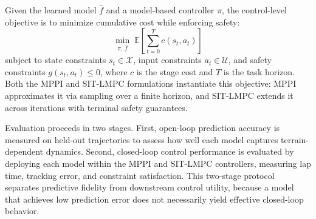Given the learned model $\hat{f}$ and a model-based controller $\pi$, the control-level objective is to minimize cumulative cost while enforcing safety:
\begin{equation}
  \min_{\pi,\, \hat{f}} \;\mathbb{E}\!\left[\sum_{t=0}^{T} c(s_t, a_t)\right]
  \label{eq:eval-objective}
\end{equation}
subject to state constraints $s_t \in \mathcal{X}$, input constraints $a_t \in \mathcal{U}$, and safety constraints $g(s_t, a_t) \le 0$, where $c$ is the stage cost and $T$ is the task horizon. Both the MPPI and SIT-LMPC formulations instantiate this objective: MPPI approximates it via sampling over a finite horizon, and SIT-LMPC extends it across iterations with terminal safety guarantees.

Evaluation proceeds in two stages. First, open-loop prediction accuracy is measured on held-out trajectories to assess how well each model captures terrain-dependent dynamics. Second, closed-loop control performance is evaluated by deploying each model within the MPPI and SIT-LMPC controllers, measuring lap time, tracking error, and constraint satisfaction. This two-stage protocol separates predictive fidelity from downstream control utility, because a model that achieves low prediction error does not necessarily yield effective closed-loop behavior.
